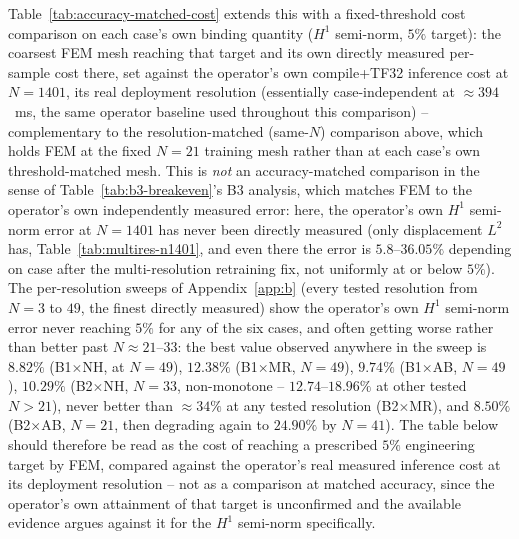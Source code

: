 \documentclass[final,5p,times]{elsarticle}
\begin{document}
Table~\ref{tab:accuracy-matched-cost} extends this with a fixed-threshold
cost comparison on each case's own binding quantity ($H^1$ semi-norm,
$5\%$ target): the coarsest FEM mesh reaching that target and its own
directly measured per-sample cost there, set against the operator's own
compile+TF32 inference cost at $N{=}1401$, its real deployment resolution
(essentially case-independent at $\approx394$~ms, the same operator
baseline used throughout this comparison) -- complementary to the
resolution-matched (same-$N$) comparison above, which holds FEM at the
fixed $N{=}21$ training mesh rather than at each case's own
threshold-matched mesh. This is \emph{not} an accuracy-matched comparison in the sense of
Table~\ref{tab:b3-breakeven}'s B3 analysis, which matches FEM to the
operator's own independently measured error: here, the operator's own
$H^1$ semi-norm error at $N{=}1401$ has never been directly measured (only
displacement $L^2$ has, Table~\ref{tab:multires-n1401}, and even there the
error is $5.8$--$36.05\%$ depending on case after the multi-resolution
retraining fix, not uniformly at or below $5\%$). The per-resolution
sweeps of Appendix~\ref{app:b} (every tested resolution from $N{=}3$ to
$49$, the finest directly measured) show the operator's own $H^1$
semi-norm error never reaching $5\%$ for any of the six cases, and often
getting worse rather than better past $N{\approx}21$--$33$: the best
value observed anywhere in the sweep is $8.82\%$ (B1$\times$NH, at
$N{=}49$), $12.38\%$ (B1$\times$MR, $N{=}49$), $9.74\%$ (B1$\times$AB,
$N{=}49$), $10.29\%$ (B2$\times$NH, $N{=}33$, non-monotone --
$12.74$--$18.96\%$ at other tested $N>21$), never better than
$\approx34\%$ at any tested resolution (B2$\times$MR), and $8.50\%$
(B2$\times$AB, $N{=}21$, then degrading again to $24.90\%$ by $N{=}41$).
The table below should therefore be read as the cost of reaching a
prescribed $5\%$ engineering target by FEM, compared against the
operator's real measured inference cost at its deployment resolution --
not as a comparison at matched accuracy, since the operator's own
attainment of that target is unconfirmed and the available evidence
argues against it for the $H^1$ semi-norm specifically.
\end{document}
